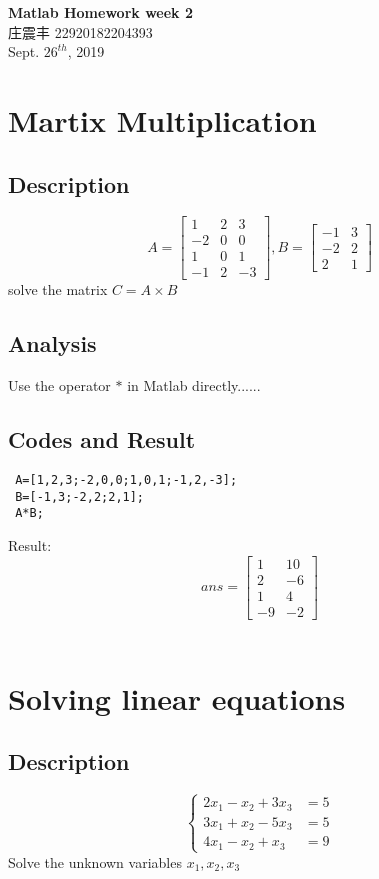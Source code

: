 \documentclass[UTF8,a4paper]{article}
\begin{document}
\begin{center}
    \textbf{\LARGE{Matlab Homework week 2}}\\[0.5cm]
    \normalsize{庄震丰 22920182204393}\\[0.5cm]
    \large{Sept. $26^{th}$, 2019}
\end{center}
\section{Martix Multiplication}
\subsection{Description}
\[A=\begin{bmatrix}
     1 & 2 &  3\\
    -2 & 0 &  0\\
     1 & 0 &  1\\
    -1 & 2 & -3
\end{bmatrix}, 
B=\begin{bmatrix}
    -1 & 3 \\
    -2 & 2 \\
     2 & 1
\end{bmatrix}\]
solve the matrix $C=A\times B$
\subsection{Analysis}
Use the operator $*$ in Matlab directly......
\subsection{Codes and Result}
\begin{lstlisting}
 A=[1,2,3;-2,0,0;1,0,1;-1,2,-3];
 B=[-1,3;-2,2;2,1];
 A*B;
\end{lstlisting}
Result:\\
\[ans=\begin{bmatrix}
    1 & 10\\
    2 & -6\\
    1 & 4\\
    -9 & -2
\end{bmatrix}\]
\\
\section{Solving linear equations}
\subsection{Description}
\begin{equation}
    \left\{
    \begin{aligned} %
    2x_1-x_2+3x_3&=5\\
    3x_1+x_2-5x_3&=5\\
    4x_1-x_2+x_3&=9
    \end{aligned}
    \right.
\end{equation}
Solve the unknown variables $x_1,x_2,x_3$ 
\end{document}
